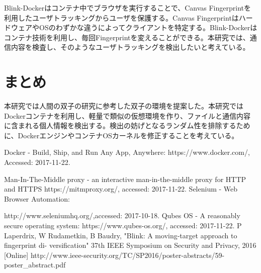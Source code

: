 \documentclass{ipsjpapers}
\begin{document}
Blink-Docker\cite{blink}はコンテナ中でブラウザを実行することで、Canvas Fingerprintを利用したユーザトラッキングからユーザを保護する。Canvas FingerprintはハードウェアやOSのわずかな違うによってクライアントを特定する。Blink-Dockerはコンテナ技術を利用し、毎回Fingerprintを変えることができる。本研究では、通信内容を検査し、そのようなユーザトラッキングを検出したいと考えている。


\section{まとめ}
本研究では人間の双子の研究に参考した双子の環境を提案した。本研究ではDockerコンテナを利用し、軽量で類似の仮想環境を作り、ファイルと通信内容に含まれる個人情報を検出する。検出の妨げとなるランダム性を排除するために、DockerエンジンやコンテナOSカーネルを修正することを考えている。





\begin{thebibliography}{1}

Docker - Build, Ship, and Run Any App, Anywhere: https://www.docker.com/, Accessed: 2017-11-22.

 Man-In-The-Middle proxy - an interactive man-in-the-middle
proxy for HTTP and HTTPS
https://mitmproxy.org/, accessed: 2017-11-22. 
 Selenium - Web Browser Automation:
 
  http://www.seleniumhq.org/,accessed: 2017-10-18.
 Qubes OS - A reasonably secure operating system:
https://www.qubes-os.org/, accessed: 2017-11-22.
 P Laperdrix, W Rudametkin, B Baudry, "Blink: A moving-target approach to fingerprint di-
versification" 37th IEEE Symposium on Security and Privacy, 2016 [Online]
http://www.ieee-security.org/TC/SP2016/poster-abstracts/59-poster\_abstract.pdf

\end{thebibliography}
\end{document}
